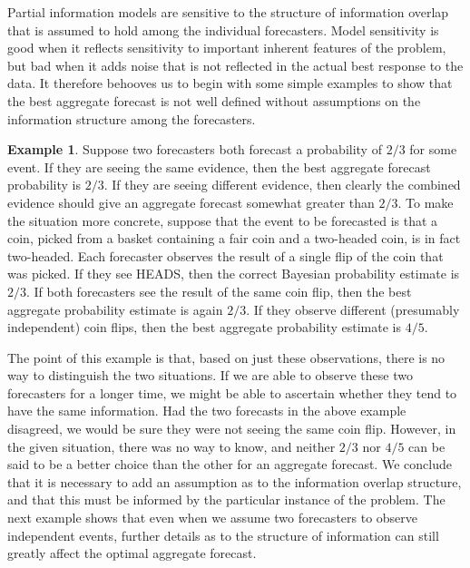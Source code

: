 \documentclass[11pt]{article}
\theoremstyle{definition}
\newtheorem{example}[theorem]{Example}
\theoremstyle{definition}
\begin{document}
Partial information models are sensitive to the structure of
information overlap that is assumed to hold among the individual
forecasters.  Model sensitivity is good when it reflects sensitivity
to important inherent features of the problem, but bad when it adds
noise that is not reflected in the actual best response to the data.
It therefore behooves us to begin with some simple examples to show
that the best aggregate forecast is not well defined without
assumptions on the information structure among the forecasters.

\begin{example}
\label{FirstExample}
Suppose two forecasters both forecast a probability of $2/3$ for some
event.  If they are seeing the same evidence, then the best aggregate
forecast probability is $2/3$.  If they are seeing different evidence,
then clearly the combined evidence should give an aggregate forecast
somewhat greater than $2/3$.  To make the situation more concrete,
suppose that the event to be forecasted is that a coin, picked from a
basket containing a fair coin and a two-headed coin, is in fact
two-headed.  Each forecaster observes the result of a single flip of
the coin that was picked.  If they see HEADS, then the correct
Bayesian probability estimate is $2/3$.  If both forecasters see the
result of the same coin flip, then the best aggregate probability
estimate is again $2/3$.  If they observe different (presumably
independent) coin flips, then the best aggregate probability estimate
is $4/5$.
\end{example}

The point of this example is that, based on just these observations,
there is no way to distinguish the two situations.  If we are able to
observe these two forecasters for a longer time, we might be able to
ascertain whether they tend to have the same information.  Had the two
forecasts in the above example disagreed, we would be sure they were
not seeing the same coin flip.  However, in the given situation, there
was no way to know, and neither $2/3$ nor $4/5$ can be said to be a
better choice than the other for an aggregate forecast.  We conclude
that it is necessary to add an assumption as to the information
overlap structure, and that this must be informed by the particular
instance of the problem. The next example shows that even when we
assume two forecasters to observe independent events, further details
as to the structure of information can still greatly affect the
optimal aggregate forecast.
\end{document}
